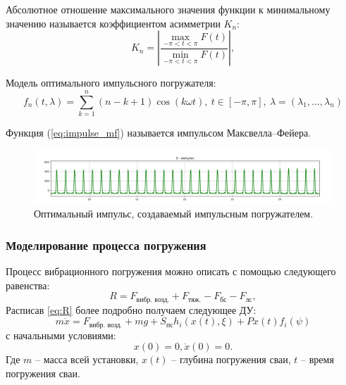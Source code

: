 \documentclass{beamer}
\begin{document}
    \begin{frame}
        Абсолютное отношение максимального значения функции к минимальному значению называется коэффициентом асимметрии $K_n$:
        \begin{equation}
            \label{eq:asymm-coef}
            K_n = \left| \frac{ \max\limits_{-\pi<t<\pi} F(t)}{\min\limits_{-\pi<t<\pi} F(t)}\right|,
        \end{equation}

        Модель оптимального импульсного погружателя:
        \begin{equation}
            \label{eq:impulse_mf}
            f_n(t, \lambda) = \sum\limits_{k = 1}^n (n-k+1) \cos(k \omega t),\ t \in [-\pi, \pi],\ \lambda =(\lambda_1, \ldots,\lambda_n)
        \end{equation}

        Функция (\ref{eq:impulse_mf}) называется импульсом Максвелла–Фейера.
    \end{frame}

    \begin{frame}
        \begin{figure}[ht]
            \centering
            \includegraphics[width=1\linewidth]{graph-impulse}
            \caption{Оптимальный импульс, создаваемый импульсным погружателем.}
            \label{fig:graph-impulse}
        \end{figure}
    \end{frame}

    \begin{frame}
        \frametitle{Моделирование процесса погружения}
        Процесс вибрационного погружения можно описать с помощью следующего равенства:
        \begin{equation}
            \label{eq:R}
            R = F_\text{вибр. возд.} + F_\text{тяж.} - F_\text{бс} - F_\text{лс},
        \end{equation}
        Расписав \ref{eq:R} более подробно получаем следующее ДУ:
        \begin{equation}
            \label{eq:main}
            m\ddot{x} = F_\text{вибр. возд.} + mg + S_\text{пс} h_i(x(t), \xi) + P x(t) f_i(\psi)
        \end{equation}
        с начальными условиями:
        \begin{equation*}
            x(0) = 0, \dot{x}(0) = 0.
        \end{equation*}
        Где $m$ -- масса всей установки, $x(t)$ -- глубина погружения сваи, $t$ -- время погружения сваи.
    \end{frame}
\end{document}
